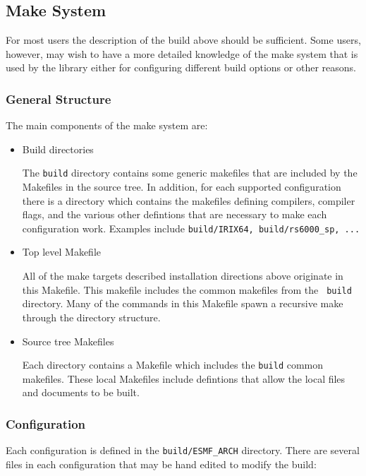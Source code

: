 %
%
\subsection{Make System}
For most users the description of the build above should be sufficient.  Some
users, however, may wish to have a more detailed knowledge of the make system
that is used by the library either for configuring different build options or
other reasons.
\subsubsection{General Structure}
The main components of the make system are:
\begin{itemize}
\item{Build directories}

The {\tt build} directory contains some generic makefiles that are included by
the Makefiles in the source tree.  In addition, for each supported
configuration there is a directory which contains the makefiles defining
compilers, compiler flags, and the various other defintions that are necessary
to make each configuration work.  Examples include {\tt build/IRIX64,
build/rs6000\_sp, ...}

\item{Top level Makefile}

All of the make targets described installation directions above originate in
this Makefile.  This makefile includes the common makefiles from the {\tt
build} directory.  Many of the commands in this Makefile spawn a recursive make
through the directory structure.

\item{Source tree Makefiles}

Each directory contains a Makefile which includes the {\tt build} common
makefiles.  These local Makefiles include defintions that allow the local files
and documents to be built.
\end{itemize}

\subsubsection{Configuration}

Each configuration is defined in the {\tt build/ESMF\_ARCH} directory.  There
are several files in each configuration that may be hand edited to modify the
build:


